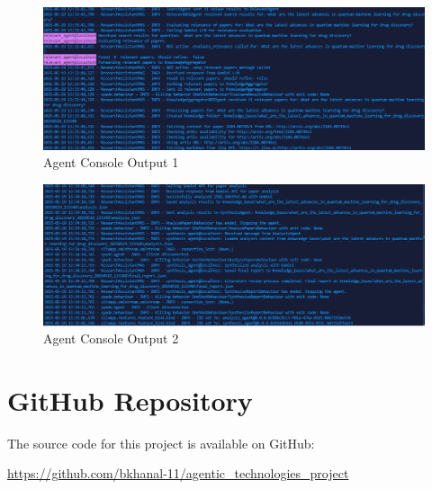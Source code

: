 \documentclass{article}
\begin{document}
\begin{figure}[H]
    \centering
    \includegraphics[width=\textwidth]{images/Screenshot_3.png}
    \caption{Agent Console Output 1}
    \label{fig:screenshot3}
\end{figure}

\begin{figure}[H]
    \centering
    \includegraphics[width=\textwidth]{images/Screenshot_4.png}
    \caption{Agent Console Output 2}
    \label{fig:screenshot4}
\end{figure}

\section*{GitHub Repository}
The source code for this project is available on GitHub:
\begin{center}
  \url{https://github.com/bkhanal-11/agentic_technologies_project}
\end{center}
\end{document}
